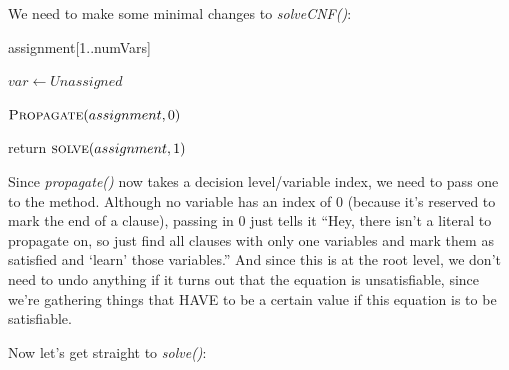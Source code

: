 We need to make some minimal changes to \textit{solveCNF()}:

\begin{algorithm}[H]
\caption{Main Solving Method}\label{alg:12}
\begin{algorithmic}[1]


\State assignment[1..numVars]

    \State $var \gets Unassigned$
\EndFor

\State $\Call{Propagate}{assignment, 0}$

\State return $\Call{solve}{assignment, 1}$

\EndProcedure
\end{algorithmic}
\end{algorithm}

Since \textit{propagate()} now takes a decision level/variable index, we need to pass 
one to the method. Although no variable has an index of 0 (because it's reserved to mark the 
end of a clause), passing in $0$ just tells it ``Hey, there isn't a literal to propagate on,
so just find all clauses with only one variables and mark them as satisfied and `learn' those 
variables.'' And since this is at the root level, we don't need to undo anything if it turns out 
that the equation is unsatisfiable, since we're gathering things that HAVE to be a certain value 
if this equation is to be satisfiable.

Now let's get straight to \textit{solve()}:

